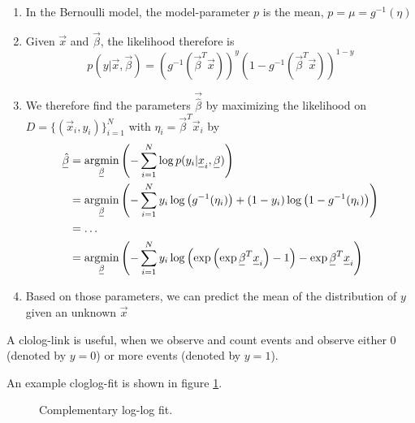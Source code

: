 \begin{enumerate}
    \item In the Bernoulli model, the model-parameter $p$ is the mean, $p = \mu = g^{-1}(\eta)$
    \item Given $\vec{x}$ and $\vec{\beta}$, the likelihood therefore is
    \begin{equation}
        p(y | \vec{x}, \vec{\beta}) = (g^{-1}(\vec{\beta}^T \vec{x}))^y (1-g^{-1}(\vec{\beta}^T \vec{x}))^{1-y}
    \end{equation}
    \item We therefore find the parameters $\vec{\hat{\beta}}$ by maximizing the likelihood on $D = \{(\vec{x}_i,y_i)\}_{i=1}^N$ with $\eta_i = \vec{\beta}^T \vec{x}_i$ by
    \begin{equation}
        \begin{aligned}
            \vec{\hat{\beta}} &= \argmin_{\vec{\beta}} \left( - \sum_{i=1}^N \log{p(y_i | \vec{x}_i, \vec{\beta})} \right) \\
                              &= \argmin_{\vec{\beta}} \left( - \sum_{i=1}^{N} y_i \log{\left( g^{-1}(\eta_i) \right) } + (1-y_i) \log{\left( 1 - g^{-1}(\eta_i) \right)} \right) \\
                              &= \dots \\
                              &= \argmin_{\vec{\beta}} \left( - \sum_{i=1}^{N} y_i \log{\left( \exp{\left(\exp{ \vec{\beta}^T \vec{x}_i}\right)} - 1 \right)} - \exp{ \vec{\beta}^T \vec{x}_i}\right)
        \end{aligned}
    \end{equation}
    \item Based on those parameters, we can predict the mean of the distribution of $y$ given an unknown $\vec{x}$
\end{enumerate}

A clolog-link is useful, when we observe and count events and observe either 0 (denoted by $y = 0$) or more events (denoted by $y = 1$).

An example cloglog-fit is shown in figure \ref{fig:cloglog_fit}.

\begin{figure}[!htb]
 \centering
 \hfill
 \caption{Complementary log-log fit.}
 \label{fig:cloglog_fit}
\end{figure}

